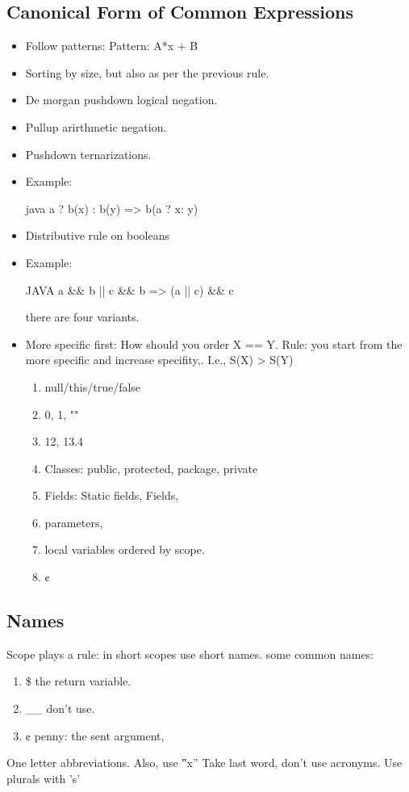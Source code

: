 \subsection{Canonical Form of Common Expressions}
\begin{itemize}
  \item Follow patterns: Pattern: A*x + B
  \item Sorting by size, but also as per the previous rule.
  \item De morgan pushdown logical negation.
  \item Pullup arirthmetic negation.
  \item Pushdown ternarizations.
  \item Example:
  \begin{code}{java}
   a ? b(x) : b(y) => b(a ? x: y)
  \end{code}
  \item Distributive rule on booleans
  \item Example:
    \begin{code}{JAVA}
a && b || c && b => (a || c) && c
    \end{code}
      there are four variants.
  \item More specific first: How should you order X == Y.
        Rule: you start from the more specific and increase specifity,.
        I.e., S(X) > S(Y)

        \begin{enumerate}
          \item null/this/true/false
          \item 0, 1, ""
          \item 12, 13.4
          \item Classes: public, protected, package, private
          \item Fields: Static fields, Fields,
          \item parameters,
          \item local variables ordered by scope.
          \item ¢
        \end{enumerate}
\end{itemize}

\subsection{Names}
Scope plays a rule:
in short scopes use short names.
some common names:
\begin{enumerate}
  \item \$ the return variable.
  \item \_\_ don't use.
  \item ¢ penny: the sent argument,
\end{enumerate}
One letter abbreviations.
Also, use ‟x”
Take last word, don't use acronyms.
Use plurals with 's'

